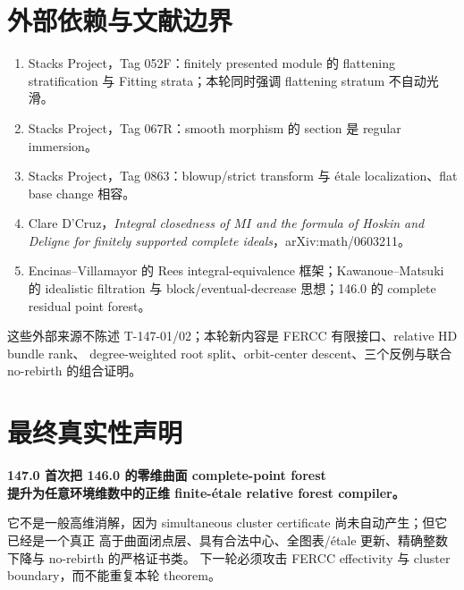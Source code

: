 \documentclass[11pt,a4paper,fontset=fandol]{ctexart}
\begin{document}
\section{外部依赖与文献边界}
\begin{enumerate}
\item Stacks Project，Tag 052F：finitely presented module 的 flattening stratification 与 Fitting
strata；本轮同时强调 flattening stratum 不自动光滑。
\item Stacks Project，Tag 067R：smooth morphism 的 section 是 regular immersion。
\item Stacks Project，Tag 0863：blowup/strict transform 与 étale localization、flat base change 相容。
\item Clare D'Cruz，\emph{Integral closedness of $MI$ and the formula of Hoskin and Deligne for
finitely supported complete ideals}，arXiv:math/0603211。
\item Encinas--Villamayor 的 Rees integral-equivalence 框架；Kawanoue--Matsuki 的 idealistic
filtration 与 block/eventual-decrease 思想；146.0 的 complete residual point forest。
\end{enumerate}
这些外部来源不陈述 T-147-01/02；本轮新内容是 FERCC 有限接口、relative HD bundle rank、
degree-weighted root split、orbit-center descent、三个反例与联合 no-rebirth 的组合证明。

\section{最终真实性声明}
\begin{tcolorbox}[title=147.0 的严格结算]
\begin{center}
\Large
\textbf{147.0 首次把 146.0 的零维曲面 complete-point forest\\
提升为任意环境维数中的正维 finite-étale relative forest compiler。}
\end{center}
它不是一般高维消解，因为 simultaneous cluster certificate 尚未自动产生；但它已经是一个真正
高于曲面闭点层、具有合法中心、全图表/étale 更新、精确整数下降与 no-rebirth 的严格证书类。
下一轮必须攻击 FERCC effectivity 与 cluster boundary，而不能重复本轮 theorem。
\end{tcolorbox}
\end{document}
